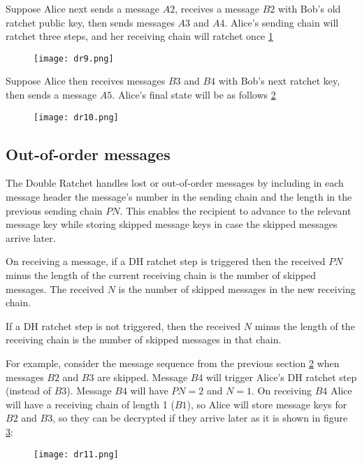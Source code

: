Suppose Alice next sends a message $A2$, receives a message $B2$ with Bob’s old ratchet public key, then sends messages $A3$ and $A4$. Alice’s sending chain will ratchet three steps, and her receiving chain will ratchet once \ref{fig:dr9}

\begin{figure}[ht!]
  \centering
  \texttt{[image: dr9.png]}
  \caption{}
  \label{fig:dr9}
\end{figure}

Suppose Alice then receives messages $B3$ and $B4$ with Bob’s next ratchet key, then sends a message $A5$. Alice’s final state will be as follows \ref{fig:dr10}

\begin{figure}[ht!]
  \centering
  \texttt{[image: dr10.png]}
  \caption{}
  \label{fig:dr10}
\end{figure}

\subsection{Out-of-order messages}
\label{Out-of-orderMessages}

The Double Ratchet handles lost or out-of-order messages by including in each message header the message’s number in the sending chain and the length in the previous sending chain $PN$. This enables the recipient to advance to the relevant message key while storing skipped message keys in case the skipped messages arrive later.

On receiving a message, if a DH ratchet step is triggered then the received $PN$ minus the length of the current receiving chain is the number of skipped messages. The received $N$ is the number of skipped messages in the new receiving chain.

If a DH ratchet step is not triggered, then the received $N$ minus the length of the receiving chain is the number of skipped messages in that chain.

For example, consider the message sequence from the previous section \ref{fig:dr10} when messages $B2$ and $B3$ are skipped. Message $B4$ will trigger Alice’s DH ratchet step (instead of $B3$). Message $B4$ will have $PN = 2$ and $N =1$. On receiving $B4$ Alice will have a receiving chain of length 1 ($B1$), so Alice will store message keys for $B2$ and $B3$, so they can be decrypted if they arrive later as it is shown in figure \ref{fig:dr11}:

\begin{figure}[ht!]
  \centering
  \texttt{[image: dr11.png]}
  \caption{}
  \label{fig:dr11}
\end{figure}

